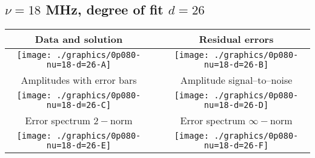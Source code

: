 

% 

\clearpage{}
\break{}

\subsection{$\nu = 18$ MHz, degree of fit $d = 26$}

\begin{table}[h]
    \begin{center}
        \begin{tabular}{ccc}
            Data and solution & \quad & Residual errors \\\hline
            \texttt{[image: ./graphics/0p080-nu=18-d=26-A]} &&
            \texttt{[image: ./graphics/0p080-nu=18-d=26-B]} \\[15pt]
            Amplitudes with error bars && Amplitude signal--to--noise \\\hline
            \texttt{[image: ./graphics/0p080-nu=18-d=26-C]} &&
            \texttt{[image: ./graphics/0p080-nu=18-d=26-D]} \\[15pt]
            Error spectrum $2-$norm && Error spectrum $\infty-$norm \\\hline
            \texttt{[image: ./graphics/0p080-nu=18-d=26-E]} &&
            \texttt{[image: ./graphics/0p080-nu=18-d=26-F]} \\[15pt]
        \end{tabular}
    \end{center}
\label{fig:elev=80, nu=18}
\end{table}



\endinput
